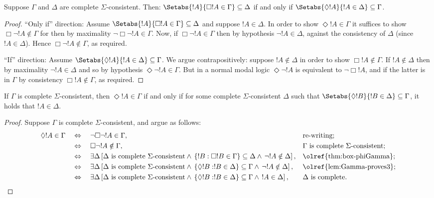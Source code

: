 \documentclass[../../../include/open-logic-section]{subfiles}
\begin{document}
\begin{lem}
  Suppose $\Gamma$ and $\Delta$ are complete
  $\Sigma$-consistent. Then: $\Setabs{!A}{\Box!A \in \Gamma}
    \subseteq \Delta$ if and only if $\Setabs{\Diamond!A}{!A \in
      \Delta} \subseteq \Gamma$.
\end{lem}

\begin{proof}
  ``Only if'' direction: Assume $\Setabs{!A}{\Box!A \in \Gamma}
  \subseteq \Delta$ and suppose $!A \in \Delta$.  In order to
  show $\Diamond!A \in \Gamma$ it suffices to show $\Box\lnot!A
  \notin \Gamma$ for then by maximality $\lnot\Box\lnot !A \in
  \Gamma$. Now, if $\Box\lnot!A \in \Gamma$ then by hypothesis
  $\lnot!A \in \Delta$, against the consistency of $\Delta$
  (since $!A \in \Delta$). Hence  $\Box\lnot!A \notin
  \Gamma$, as required.

  ``If'' direction: Assume $\Setabs{\Diamond!A}{!A \in \Delta}
  \subseteq \Gamma$. We argue contrapositively: suppose $!A
  \notin \Delta$ in order to show $\Box!A \notin \Gamma$. If
  $!A \notin \Delta$ then by maximality $\lnot!A \in \Delta$
  and so by hypothesis $\Diamond\lnot!A \in\Gamma$. But in a
  normal modal logic $\Diamond\lnot!A$ is equivalent to
  $\lnot\Box !A$, and if the latter is in $\Gamma$ by consistency
  $\Box!A \notin\Gamma$, as required.
\end{proof}

\begin{cor}
  If $\Gamma$ is complete $\Sigma$-consistent, then $\Diamond !A \in
  \Gamma$ if and only if for some complete $\Sigma$-consistent
  $\Delta$ such that $\Setabs{\Diamond!B}{!B \in \Delta} \subseteq
  \Gamma$, it holds that $!A \in \Delta$.
\end{cor}

\begin{proof}
Suppose $\Gamma$ is complete $\Sigma$-consistent, and argue as
follows:
\begin{align*}
  \Diamond!A \in \Gamma & \quad \Leftrightarrow\quad \lnot\Box\lnot !A \in
  \Gamma, && \text{re-writing}; \\
  & \quad \Leftrightarrow\quad \Box\lnot!A \notin \Gamma, && \Gamma
  \text{ is complete $\Sigma$-consistent}; \\ 
  & \quad \Leftrightarrow\quad \exists\Delta \left[ \Delta \text{ is
    complete $\Sigma$-consistent} {} \land {\,} \{ !B : \Box !B \in \Gamma \}
  \subseteq \Delta  {} \land {\,} \lnot!A \notin\Delta\right], &&
   \text{\olref{thm:box-phiGamma}}; \\
 & \quad \Leftrightarrow\quad \exists\Delta \left[ \Delta \text{ is
    complete $\Sigma$-consistent} {} \land {\,} \{\Diamond !B : !B \in \Delta \}
  \subseteq \Gamma  {} \land {\,} \lnot!A \notin\Delta\right], && 
   \text{\olref{lem:Gamma-proves3}}; \\
& \quad \Leftrightarrow\quad \exists\Delta \left[ \Delta \text{ is
    complete $\Sigma$-consistent} {} \land {\,} \{\Diamond !B : !B \in \Delta \}
  \subseteq \Gamma  {} \land {\,} !A \in\Delta\right], && \Delta
\text{ is complete}. \qedhere  
\end{align*}
\end{proof}
\end{document}
